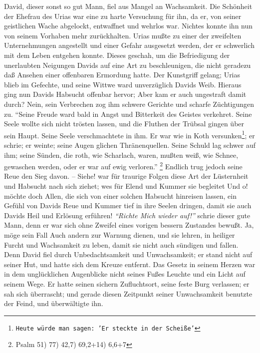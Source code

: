 David, dieser sonst so gut Mann, fiel aus Mangel an
Wachsamkeit. Die Schönheit
der Ehefrau des Urias war eine zu harte
Versuchung für ihn, da er, von seiner
geistlichen Wache abgelockt, entwaffnet und wehrlos war. Nichtes konnte ihn nun
von seinem Vorhaben mehr zurückhalten. Urias mußte zu
einer der zweifelten
Unternehmungen angestellt und einer Gefahr ausgesetzt werden, der er schwerlich
mit dem Leben entgehen konnte. Dieses geschah, um die Befriedigung der
unerlaubten Neigungen Davids auf eine Art zu beschleunigen, die nicht geradezu
daß Ansehen einer offenbaren Ermordung hatte. Der Kunstgriff gelang; Urias blieb
im Gefechte, und seine Wittwe ward unverzüglich Davids Weib. Hieraus ging nun
Davids Habsucht offenbar hervor; Aber kam er auch ungestraft
damit durch? Nein,
sein Verbrechen zog ihm schwere Gerichte und scharfe Züchtigungen zu.
"`Seine
Freude ward bald in Angst und Bitterkeit des Geistes verkehret. Seine Seele
wollte sich nicht trösten lassen, und die Fluthen der Trübsal gingen über sein
Haupt. Seine Seele verschmachtete in ihm. Er war wie in Koth
versunken\footnote{\texttt{Heute würde man sagen: 'Er steckte in der Scheiße'}};
er schrie; er weinte;
seine Augen glichen Thränenquellen. Seine Schuld lag schwer auf ihm; seine
Sünden, die roth, wie Scharlach, waren, mußten weiß, wie Schnee, gewaschen
werden, oder er war auf ewig verloren."'
\footnote{Psalm 51) 77) 42,7) 69,2+14) 6,6+7}
Endlich trug jedoch seine Reue den Sieg davon. -- Siehe! war für
traurige Folgen diese Art der Lüsternheit und Habsucht nach
sich ziehet; wes für
Elend und Kummer sie begleitet Und o! möchte doch Allen, die sich von einer
solchen Habsucht hinreisen lassen, ein Gefühl von Davids Reue und Kummer tief in
ihre Seelen dringen, damit sie auch Davids Heil und Erlösung erführen!
\textit{"`Richte
Mich wieder auf!"'} schrie dieser gute Mann, denn er war sich ohne Zweifel eines
vorigen bessern Zustandes bewußt. Ja, möge sein Fall Auch andern zur Warnung
dienen, und sie lehren, in heiliger Furcht und Wachsamkeit
zu leben, damit sie
nicht auch sündigen und fallen. Denn David fiel durch Unbedachtsamkeit und
Unwachsamkeit; er stand nicht auf seiner Hut, und hatte sich dem Kreuze
entfernt. Das Gesetz in seinem Herzen war in dem
unglücklichen Augenblicke nicht
seines Fußes Leuchte und ein Licht auf seinem Wege. Er hatte seinen sichern
Zufluchtsort, seine feste Burg verlassen; er sah sich überrascht; und gerade
diesen Zeitpunkt seiner Unwachsamkeit benutzte der Feind, und überwältigte ihn.

